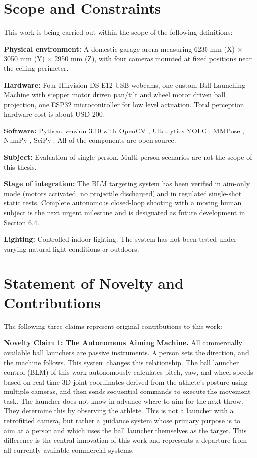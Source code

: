 \section{Scope and Constraints}

This work is being carried out within the scope of the following definitions:

\textbf{Physical environment:} A domestic garage arena measuring 6230 mm (X) $\times$ 3050 mm (Y) $\times$ 2950 mm (Z), with four cameras mounted at fixed positions near the ceiling perimeter.

\textbf{Hardware:} Four Hikvision DS-E12 USB webcams, one custom Ball Launching Machine with stepper motor driven pan/tilt and wheel motor driven ball projection, one ESP32 microcontroller for low level actuation. Total perception hardware cost is about USD 200.

\textbf{Software:} Python: version 3.10 with OpenCV \cite{ref27}, Ultralytics YOLO \cite{ref14}, MMPose \cite{ref17}, NumPy \cite{ref28}, SciPy \cite{ref29}. All of the components are open source.

\textbf{Subject:} Evaluation of single person. Multi-person scenarios are not the scope of this thesis.

\textbf{Stage of integration:} The BLM targeting system has been verified in aim-only mode (motors activated, no projectile discharged) and in regulated single-shot static tests. Complete autonomous closed-loop shooting with a moving human subject is the next urgent milestone and is designated as future development in Section 6.4.

\textbf{Lighting:} Controlled indoor lighting. The system has not been tested under varying natural light conditions or outdoors.

\section{Statement of Novelty and Contributions}

The following three claims represent original contributions to this work:

\textbf{Novelty Claim 1: The Autonomous Aiming Machine.}
All commercially available ball launchers are passive instruments. A person sets the direction, and the machine follows. This system changes this relationship. The ball launcher control (BLM) of this work autonomously calculates pitch, yaw, and wheel speeds based on real-time 3D joint coordinates derived from the athlete's posture using multiple cameras, and then sends sequential commands to execute the movement task. The launcher does not know in advance where to aim for the next throw. They determine this by observing the athlete. This is not a launcher with a retrofitted camera, but rather a guidance system whose primary purpose is to aim at a person and which uses the ball launcher themselves as the target. This difference is the central innovation of this work and represents a departure from all currently available commercial systems.

